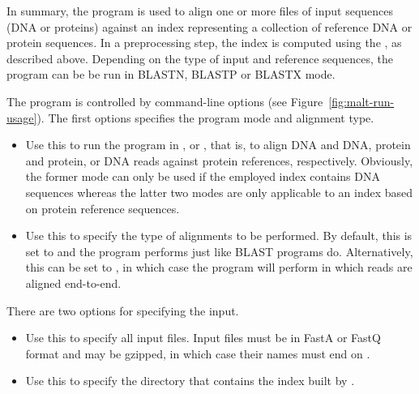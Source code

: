 \documentclass[11pt]{article}
\begin{document}
\FloatBarrier


In summary,
the  program  is used to align one or more files of input sequences  (DNA or proteins) against
an index representing a collection of reference  {DNA  or} protein sequences. In a preprocessing step, the index is computed
using the , as described above. Depending on the type of input and reference sequences, 
the program can be be run in {BLASTN,} BLASTP or BLASTX mode.

The  program is controlled by command-line options (see Figure~\ref{fig:malt-run-usage}). 
The first options specifies the program mode and alignment type.
\begin{itemize}
\setlength{\itemindent}{30pt}

\item[\itt{--mode}] Use this to run the program in {,}  or
, that is, to align {DNA and DNA,} protein and protein, or DNA reads against protein references, respectively. Obviously, the former mode can only be used if the employed index contains DNA
sequences whereas the latter two modes are only applicable to an index based on protein reference sequences.
\item[\itt{--alignmentType}]  Use this to specify the type of alignments to be performed.
By default, this is set to  and the program performs  just like BLAST programs do.
Alternatively, this can be set to , in which case the program will perform 
in which reads are aligned end-to-end. 
\end{itemize}

There are two options for specifying the input.
\begin{itemize}
\setlength{\itemindent}{30pt}
\item [\itt{--inFile}] Use this to specify all input files. Input files must be in FastA or FastQ format and
may be gzipped, in which case their names must end on . 
\item[\itt{--index}] Use this to specify the directory that contains the index built by .
\end{itemize}
\end{document}

